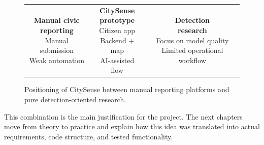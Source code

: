 \begin{figure}[htbp]
\centering
\setlength{\tabcolsep}{4pt}
\begin{tabular}{c c c}
\fbox{\parbox{0.19\textwidth}{\centering \textbf{Manual civic}\\\textbf{reporting}\\[4pt]\footnotesize Manual submission\\Weak automation}} &
\fbox{\parbox{0.19\textwidth}{\centering \textbf{CitySense}\\\textbf{prototype}\\[4pt]\footnotesize Citizen app\\Backend + map\\AI-assisted flow}} &
\fbox{\parbox{0.19\textwidth}{\centering \textbf{Detection}\\\textbf{research}\\[4pt]\footnotesize Focus on model quality\\Limited operational workflow}}
\end{tabular}
\caption{Positioning of CitySense between manual reporting platforms and pure detection-oriented research.}
\label{fig:citysense_positioning}
\end{figure}

This combination is the main justification for the project. The next chapters move from theory to practice and explain how this idea was translated into actual requirements, code structure, and tested functionality.
